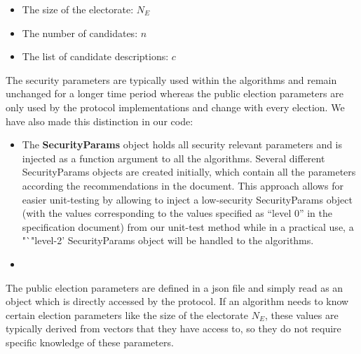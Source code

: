 \documentclass[a4paper,12pt]{report}
\begin{document}
\begin{itemize}
	\item The size of the electorate: $N_E$
	\item The number of candidates: $n$
	\item The list of candidate descriptions: $c$
\end{itemize}

The security parameters are typically used within the algorithms and remain unchanged for a longer time period whereas the public election parameters are only used by the protocol implementations and change with every election. We have also made this distinction in our code:

\begin{itemize}
	\item The \textbf{SecurityParams} object holds all security relevant parameters and is injected as a function argument to all the algorithms. Several different SecurityParams objects are created initially, which contain all the parameters according the recommendations in the document. This approach allows for easier unit-testing by allowing to inject a low-security SecurityParams object (with the values corresponding to the values specified as "`level 0"' in the specification document) from our unit-test method while in a practical use, a "`"level-2' SecurityParams object will be handled to the algorithms.
	\item
\end{itemize}

The public election parameters are defined in a json file and simply read as an object which is directly accessed by the protocol. If an algorithm needs to know certain election parameters like the size of the electorate $N_E$, these values are typically derived from vectors that they have access to, so they do not require specific knowledge of these parameters.
\end{document}
